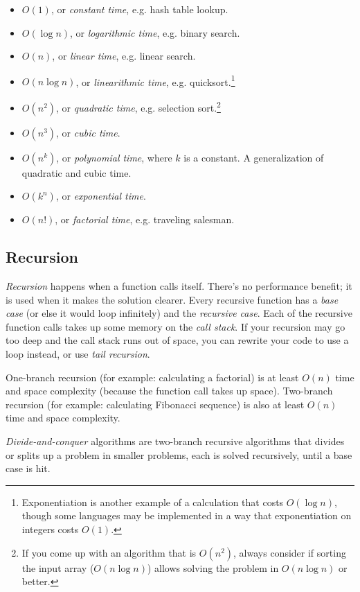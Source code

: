 \documentclass[8pt, table, xcdraw]{article}%
\begin{document}
\begin{itemize}
    \item $O(1)$, or \emph{constant time}, e.g. hash table lookup.
    \item $O(\log n)$, or \emph{logarithmic time}, e.g. binary search.
    \item $O(n)$, or \emph{linear time}, e.g. linear search.
    \item $O(n \log n)$, or \emph{linearithmic time}, e.g. quicksort.\footnote{Exponentiation is another example of a calculation that costs $O(\log n)$, though some languages may be implemented in a way that exponentiation on integers costs $O(1)$.}
    \item $O(n^2)$, or \emph{quadratic time}, e.g. selection sort.\footnote{If you come up with an algorithm that is $O(n^2)$, always consider if sorting the input array ($O(n \log n)$) allows solving the problem in $O(n \log n)$ or better.}
    \item $O(n^3)$, or \emph{cubic time}.
    \item $O(n^k)$, or \emph{polynomial time}, where $k$ is a constant. A generalization of quadratic and cubic time.
    \item $O(k^n)$, or \emph{exponential time}.
    \item $O(n!)$, or \emph{factorial time}, e.g. traveling salesman.
\end{itemize}

\subsection{Recursion}
\emph{Recursion} happens when a function calls itself. There’s no performance benefit; it is used when it makes the solution clearer. Every recursive function has a \emph{base case} (or else it would loop infinitely) and the \emph{recursive case}. Each of the recursive function calls takes up some memory on the \emph{call stack}. If your recursion may go too deep and the call stack runs out of space, you can rewrite your code to use a loop instead, or use \emph{tail recursion}.

One-branch recursion (for example: calculating a factorial) is at least $O(n)$ time and space complexity (because the function call takes up space). Two-branch recursion (for example: calculating Fibonacci sequence) is also at least $O(n)$ time and space complexity.

\emph{Divide-and-conquer} algorithms are two-branch recursive algorithms that divides or splits up a problem in smaller problems, each is solved recursively, until a base case is hit.
\end{document}
